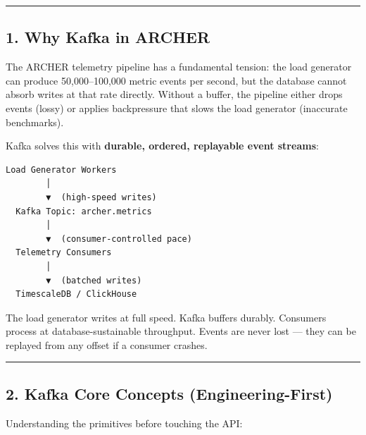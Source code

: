 \documentclass[
]{article}
\begin{document}
\begin{center}\rule{0.5\linewidth}{0.5pt}\end{center}

\hypertarget{why-kafka-in-archer}{%
\subsection{1. Why Kafka in ARCHER}\label{why-kafka-in-archer}}

The ARCHER telemetry pipeline has a fundamental tension: the load
generator can produce 50,000--100,000 metric events per second, but the
database cannot absorb writes at that rate directly. Without a buffer,
the pipeline either drops events (lossy) or applies backpressure that
slows the load generator (inaccurate benchmarks).

Kafka solves this with \textbf{durable, ordered, replayable event
streams}:

\begin{verbatim}
Load Generator Workers
        │
        ▼  (high-speed writes)
  Kafka Topic: archer.metrics
        │
        ▼  (consumer-controlled pace)
  Telemetry Consumers
        │
        ▼  (batched writes)
  TimescaleDB / ClickHouse
\end{verbatim}

The load generator writes at full speed. Kafka buffers durably.
Consumers process at database-sustainable throughput. Events are never
lost --- they can be replayed from any offset if a consumer crashes.

\begin{center}\rule{0.5\linewidth}{0.5pt}\end{center}

\hypertarget{kafka-core-concepts-engineering-first}{%
\subsection{2. Kafka Core Concepts
(Engineering-First)}\label{kafka-core-concepts-engineering-first}}

Understanding the primitives before touching the API:
\end{document}
